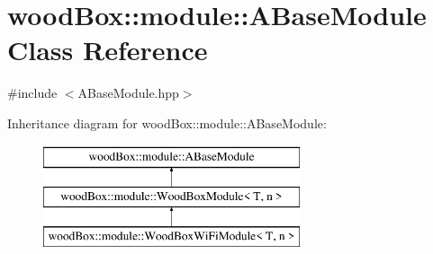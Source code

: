 \hypertarget{classwood_box_1_1module_1_1_a_base_module}{}\section{wood\+Box\+:\+:module\+:\+:A\+Base\+Module Class Reference}
\label{classwood_box_1_1module_1_1_a_base_module}


{\ttfamily \#include $<$A\+Base\+Module.\+hpp$>$}

Inheritance diagram for wood\+Box\+:\+:module\+:\+:A\+Base\+Module\+:\begin{figure}[H]
\begin{center}
\leavevmode
\includegraphics[height=3.000000cm]{classwood_box_1_1module_1_1_a_base_module}
\end{center}
\end{figure}
